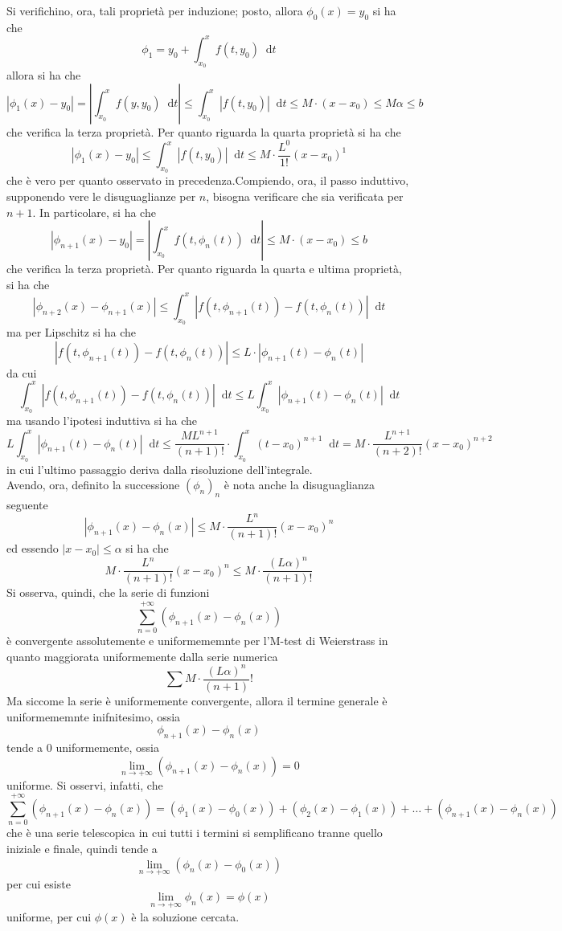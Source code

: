 \documentclass[a4paper]{extarticle}
\newcommand*\dif{\mathop{}\!\mathrm{d}}
\begin{document}
\vspace{1em}
Si verifichino, ora, tali proprietà per induzione; posto, allora $\phi_0(x)=y_0$ si ha che
\[\phi_1 = y_0 + \int_{x_0}^x f(t,y_0) \dif t\]
allora si ha che
\[\left\vert\phi_1(x) - y_0\right\vert = \left\vert \int_{x_0}^x f(y,y_0) \dif t \right\vert \leq \int_{x_0}^x \left\vert f(t,y_0) \right \vert \dif t \leq M \cdot (x-x_0) \leq M \alpha \leq b\]
che verifica la terza proprietà. Per quanto riguarda la quarta proprietà si ha che
\[\left\vert \phi_1(x) - y_0 \right\vert \leq \int_{x_0}^x \left\vert f(t,y_0) \right\vert \dif t \leq M \cdot \dfrac{L^0}{1!} (x-x_0)^1\]
che è vero per quanto osservato in precedenza.Compiendo, ora, il passo induttivo, supponendo vere le disuguaglianze per $n$, bisogna verificare che sia verificata per $n+1$. In particolare, si ha che
\[\left\vert \phi_{n+1}(x) - y_0 \right\vert = \left\vert \int_{x_0}^x f(t,\phi_n(t)) \dif t \right\vert \leq M \cdot (x-x_0) \leq b\]
che verifica la terza proprietà. Per quanto riguarda la quarta e ultima proprietà, si ha che
\[\left\vert \phi_{n+2}(x) - \phi_{n+1}(x)\right\vert \leq \int_{x_0}^x \left\vert f(t,\phi_{n+1}(t)) - f(t,\phi_n(t))\right\vert \dif t\]
ma per Lipschitz si ha che
\[\left\vert f(t,\phi_{n+1}(t)) - f(t,\phi_n(t))\right\vert \leq L \cdot \left\vert \phi_{n+1}(t) - \phi_n(t) \right \vert\]
da cui
\[\int_{x_0}^x \left\vert f(t,\phi_{n+1}(t)) - f(t,\phi_n(t))\right\vert \dif t \leq L \int_{x_0}^x \left\vert \phi_{n+1}(t) - \phi_n(t) \right\vert \dif t\]
ma usando l'ipotesi induttiva si ha che
\[L \int_{x_0}^x \left\vert \phi_{n+1}(t) - \phi_n(t) \right\vert \dif t \leq \dfrac{M L^{n+1}}{(n+1)!} \cdot \int_{x_0}^x (t-x_0)^{n+1} \dif t = M \cdot \dfrac{L^{n+1}}{(n+2)!} (x-x_0)^{n+2}\]
in cui l'ultimo passaggio deriva dalla risoluzione dell'integrale.\\
Avendo, ora, definito la successione $(\phi_n)_n$ è nota anche la disuguaglianza seguente
\[\left\vert\phi_{n+1}(x)-\phi_n(x)\right\vert\leq M \cdot \frac{L^{n}}{(n+1)!} (x-x_0)^n\]
ed essendo $\vert x-x_0 \vert \leq \alpha$ si ha che
\[M \cdot \frac{L^{n}}{(n+1)!} (x-x_0)^n \leq M \cdot \dfrac{(L\alpha)^n}{(n+1)!}\]
Si osserva, quindi, che la serie di funzioni
\[\sum_{n=0}^{+\infty} \left(\phi_{n+1}(x) - \phi_n(x)\right)\]
è convergente assolutemente e uniformememnte per l'M-test di Weierstrass in quanto maggiorata uniformemente dalla serie numerica
\[\sum M \cdot \dfrac{(L\alpha)^n}{(n+1)}!\]
Ma siccome la serie è uniformemente convergente, allora il termine generale è uniformememnte inifnitesimo, ossia
\[\phi_{n+1}(x) - \phi_n(x)\]
tende a $0$ uniformemente, ossia
\[\lim_{n \to +\infty} \left(\phi_{n+1}(x) - \phi_n(x)\right) =0\]
uniforme. Si osservi, infatti, che
\[\sum_{n=0}^{+\infty} \left(\phi_{n+1}(x) - \phi_n(x)\right) = \left(\phi_{1}(x) - \phi_0(x)\right) + \left(\phi_{2}(x) - \phi_1(x)\right) + \dots + \left(\phi_{n+1}(x) - \phi_n(x)\right)\]
che è una serie telescopica in cui tutti i termini si semplificano tranne quello iniziale e finale, quindi tende a
\[\lim_{n \to +\infty} \left(\phi_{n}(x) - \phi_0(x)\right)\]
per cui esiste
\[\lim_{n \to +\infty} \phi_n(x) = \phi(x)\]
uniforme, per cui $\phi(x)$ è la soluzione cercata.
\end{document}
